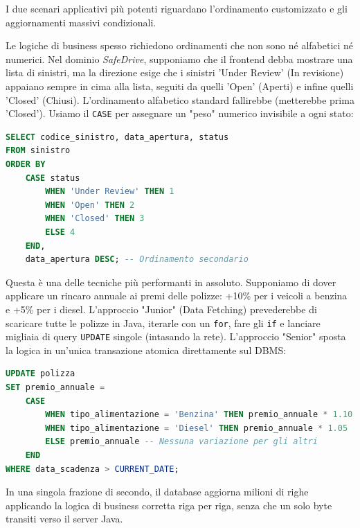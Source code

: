 I due scenari applicativi più potenti riguardano l'ordinamento customizzato e gli aggiornamenti massivi condizionali.

\begin{example}
Le logiche di business spesso richiedono ordinamenti che non sono né alfabetici né numerici. Nel dominio \textit{SafeDrive}, supponiamo che il frontend debba mostrare una lista di sinistri, ma la direzione esige che i sinistri 'Under Review' (In revisione) appaiano sempre in cima alla lista, seguiti da quelli 'Open' (Aperti) e infine quelli 'Closed' (Chiusi). 
L'ordinamento alfabetico standard fallirebbe (metterebbe prima 'Closed'). Usiamo il \texttt{CASE} per assegnare un "peso" numerico invisibile a ogni stato:

\begin{lstlisting}[language=SQL, basicstyle=\ttfamily\small, keywordstyle=\color{blue}\bfseries]
SELECT codice_sinistro, data_apertura, status
FROM sinistro
ORDER BY 
    CASE status
        WHEN 'Under Review' THEN 1
        WHEN 'Open' THEN 2
        WHEN 'Closed' THEN 3
        ELSE 4
    END, 
    data_apertura DESC; -- Ordinamento secondario
\end{lstlisting}
\end{example}

\begin{example}
Questa è una delle tecniche più performanti in assoluto. Supponiamo di dover applicare un rincaro annuale ai premi delle polizze: +10\% per i veicoli a benzina e +5\% per i diesel. 
L'approccio "Junior" (Data Fetching) prevederebbe di scaricare tutte le polizze in Java, iterarle con un \texttt{for}, fare gli \texttt{if} e lanciare migliaia di query \texttt{UPDATE} singole (intasando la rete). 
L'approccio "Senior" sposta la logica in un'unica transazione atomica direttamente sul DBMS:

\begin{lstlisting}[language=SQL, basicstyle=\ttfamily\small, keywordstyle=\color{blue}\bfseries]
UPDATE polizza
SET premio_annuale = 
    CASE 
        WHEN tipo_alimentazione = 'Benzina' THEN premio_annuale * 1.10
        WHEN tipo_alimentazione = 'Diesel' THEN premio_annuale * 1.05
        ELSE premio_annuale -- Nessuna variazione per gli altri
    END
WHERE data_scadenza > CURRENT_DATE;
\end{lstlisting}
In una singola frazione di secondo, il database aggiorna milioni di righe applicando la logica di business corretta riga per riga, senza che un solo byte transiti verso il server Java.
\end{example}

